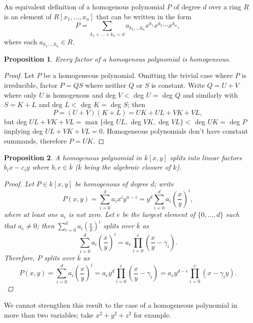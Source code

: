 \documentclass{article}
\newtheorem*{proposition*}{Proposition}
\theoremstyle{remark}
\begin{document}
An equivalent definition of a homogenous polynomial $P$ of degree $d$ over a ring $R$ is an element of $R[x_1,\ldots ,x_n]$ that can be written in the form 
\[P=\sum_{k_{1}+\ldots + k_{n}=d} a_{k_1,\ldots k_n} x^{k_{1}}x^{k_{2}}\cdots x^{k_{n}},\]
where each $a_{k_1,\ldots k_n} \in R$.
\begin{proposition*} 
Every factor of a homogenous polynomial is homogeneous.
\end{proposition*} \begin{proof}
Let $P$ be a homogeneous polynomial. Omitting the trivial case where $P$ is irreducible, factor $P=QS$ where neither $Q$ or $S$ is constant. Write $Q=U+V$ where only $U$ is homogenous and deg $V<$ deg $U=$ deg $Q$ and similarly with $S=K+L$ and deg $L<$ deg $K=$ deg $S$; then
\[P=(U+V)(K+L)=UK+UL+VK+VL,\]
but deg $UL +VK+VL=\max \{$deg $UL,$ deg $VK,$ deg $VL\}< $ deg $UK=$ deg $P$ implying deg $UL +VK+VL=0$. Homogeneous polynomials don't have constant summands, therefore $P=UK$.
\end{proof}
\begin{proposition*}
A homogenous polynomial in $k[x,y]$ splits into linear factors $b_{i}x- c_{i}y$ where $b,c\in \overline{k}$ ($\overline{k}$ being the algebraic closure of $k$).
\begin{proof}
Let $P\in k[x,y]$ be homogenous of degree $d$; write \begin{equation*}
P(x,y)=\sum_{i=0}^{d}a_i x^i y^{n-i}=y^d \sum_{i=0}^{d}a_i (\frac{x}{y})^i,
\end{equation*}
where at least one $a_i$ is not zero. Let $e$ be the largest element of $\{0, \ldots , d\}$ such that $a_e\neq 0$; then $\sum_{i=0}^{d}a_i (\frac{x}{y})^i$ splits over $\overline{k}$ as 
\begin{equation*}
\sum_{i=0}^{d}a_i (\frac{x}{y})^i=a_e \prod_{i=0}^{e} (\frac{x}{y} - \gamma_i).
\end{equation*}
Therefore, $P$ splits over $\overline{k}$ as 
\begin{equation*}
P(x,y)=\sum_{i=0}^{d}a_i (\frac{x}{y})^i=a_e y^d \prod_{i=0}^{e} (\frac{x}{y} - \gamma_i)=a_e y^{d-e}\prod_{i=0}^{e} (x - \gamma_i y).
\end{equation*}
\end{proof}
\end{proposition*}
We cannot strengthen this result to the case of a homogeneous polynomial in more than two variables; take $x^2 + y^2 +z^2$ for example.
\end{document}
